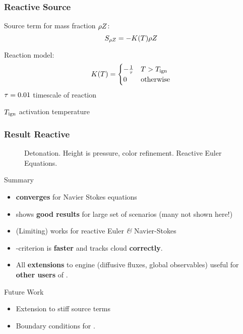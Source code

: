 \documentclass[aspectratio=169]{beamer}
\begin{document}
\begin{frame}\frametitle{Reactive Source}
Source term for mass fraction $\rho Z$:  
 \begin{equation}\label{eq:source-reaction}
  \source[\QZ] = - K(T) \QZ
\end{equation}

Reaction model:
\begin{equation}\label{eq:reaction-model}
  K(T) = 
\begin{cases}
  - \frac{1}{\tau} & T > T_{\text{ign}}\\
  0 & \text{otherwise}
\end{cases}  
\end{equation}
$\tau = 0.01$ timescale of reaction

$T_{\text{ign}}$ activation temperature
\end{frame}

\begin{frame}
  \frametitle{Result Reactive}
   \begin{figure}[h]
    \centering
    \caption{Detonation. Height is pressure, color refinement.
    Reactive Euler Equations.}
  \end{figure}
\end{frame}

\begin{frame}{Summary}
  \begin{block}{}
  \begin{itemize}
  \item \aderdg{} \textbf{converges} for Navier Stokes equations
  \item \aderdg{} shows \textbf{good results} for large set of scenarios (many not shown here!)
  \item (Limiting) \aderdg{} works for reactive Euler \textit{\&} Navier-Stokes
  \item \amr{}-criterion is \textbf{faster} and tracks cloud \textbf{correctly}.
  \item All \textbf{extensions} to engine (diffusive fluxes, global observables) useful for \textbf{other users} of \exahype{}.
  \end{itemize}
  \end{block}

  \begin{block}{Future Work}
    \begin{itemize}
    \item Extension to stiff source terms
    \item Boundary conditions for \muscl{}.  
    \end{itemize}

  \end{block}
\end{frame}
\end{document}
